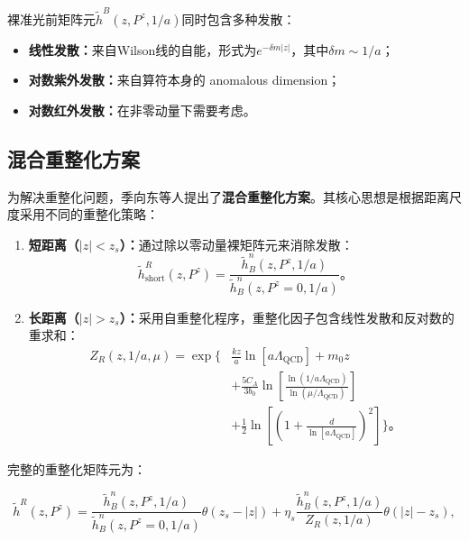 \documentclass[12pt,a4paper]{ctexart}
\theoremstyle{definition}
\begin{document}
裸准光前矩阵元$\tilde{h}^B(z, P^z, 1/a)$同时包含多种发散\cite{Ji2021hybrid,Chen2025gluon}：

\begin{itemize}
    \item \textbf{线性发散：}来自Wilson线的自能，形式为$e^{-\delta m |z|}$，其中$\delta m \sim 1/a$；
    \item \textbf{对数紫外发散：}来自算符本身的 anomalous dimension；
    \item \textbf{对数红外发散：}在非零动量下需要考虑。
\end{itemize}

\subsection{混合重整化方案}

为解决重整化问题，季向东等人提出了\textbf{混合重整化方案}\cite{Ji2021hybrid}。其核心思想是根据距离尺度采用不同的重整化策略：

\begin{enumerate}
    \item \textbf{短距离（$|z| < z_s$）：}通过除以零动量裸矩阵元来消除发散：
    \begin{equation}
    \tilde{h}^R_{\text{short}}(z, P^z) = \frac{\tilde{h}^n_B(z, P^z, 1/a)}{\tilde{h}^n_B(z, P^z=0, 1/a)}。
    \end{equation}

    \item \textbf{长距离（$|z| > z_s$）：}采用自重整化程序，重整化因子包含线性发散和反对数的重求和：
    \begin{equation}
    \begin{aligned}
    Z_R(z, 1/a, \mu) = \exp\Bigg\{&\frac{kz}{a}\ln[a\Lambda_{\text{QCD}}] + m_0 z \\
    &+ \frac{5C_A}{3b_0} \ln\left[\frac{\ln(1/a\Lambda_{\text{QCD}})}{\ln(\mu/\Lambda_{\text{QCD}})}\right] \\
    &+ \frac{1}{2}\ln\left[\left(1 + \frac{d}{\ln[a\Lambda_{\text{QCD}}]}\right)^2\right]\Bigg\}。
    \end{aligned}
    \label{eq:ZR}
    \end{equation}
\end{enumerate}

完整的重整化矩阵元为\cite{Chen2025gluon}：

\begin{equation}
\tilde{h}^R(z, P^z) = \frac{\tilde{h}^n_B(z, P^z, 1/a)}{\tilde{h}^n_B(z, P^z=0, 1/a)} \theta(z_s - |z|) + \eta_s \frac{\tilde{h}^n_B(z, P^z, 1/a)}{Z_R(z, 1/a)} \theta(|z| - z_s),
\label{eq:hybrid_renorm}
\end{equation}
\end{document}
